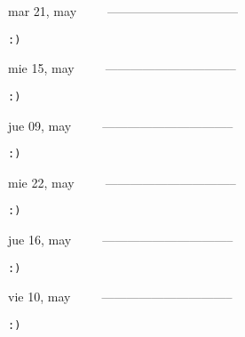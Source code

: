 \documentclass[letterpaper,10pt]{article}
\begin{document}
\begin{multicols}{3}
{mar 21, may\ \ \ \ \ --------------------------------}
\begin{flushright}\begin{small}\texttt{:)}\end{small}\end{flushright}
\vfill
{mie 15, may\ \ \ \ \ --------------------------------}
\begin{flushright}\begin{small}\texttt{:)}\end{small}\end{flushright}\par
\vfill
{jue 09, may\ \ \ \ \ --------------------------------}
\begin{flushright}\begin{small}\texttt{:)}\end{small}\end{flushright}\par
\vfill
\end{multicols}
\vspace{1.05cm}

\begin{multicols}{3}
{mie 22, may\ \ \ \ \ --------------------------------}
\begin{flushright}\begin{small}\texttt{:)}\end{small}\end{flushright}
\vfill
{jue 16, may\ \ \ \ \ --------------------------------}
\begin{flushright}\begin{small}\texttt{:)}\end{small}\end{flushright}\par
\vfill
{vie 10, may\ \ \ \ \ --------------------------------}
\begin{flushright}\begin{small}\texttt{:)}\end{small}\end{flushright}\par
\vfill
\end{multicols}
\vspace{1.05cm}
\end{document}
